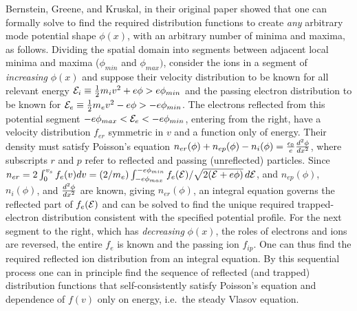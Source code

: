 \documentclass[12pt]{article}
\def\energy{{\cal E}}
\begin{document}
Bernstein, Greene, and Kruskal, in their original
paper\cite{Bernstein1957} showed that one can formally solve to find
the required distribution functions to create \emph{any} arbitrary
mode potential shape $\phi(x)$, with an arbitrary number of minima and
maxima, as follows. Dividing the spatial domain into segments between
adjacent local minima and maxima ($\phi_{min}$ and $\phi_{max})$,
consider the ions in a segment of \emph{increasing} $\phi(x)$ and
suppose their velocity distribution to be known for all relevant
energy $\energy_i\equiv {1\over 2}m_iv^2+e\phi >e\phi_{min}$ and the
passing electron distribution to be known for
$\energy_e\equiv{1\over 2}m_ev^2-e\phi >-e\phi_{min}$. The electrons
reflected from this potential segment
$-e\phi_{max}<\energy_e<-e\phi_{min}$, entering from the right, have a
velocity distribution $f_{er}$ symmetric in $v$ and a function only of
energy. Their density must satisfy Poisson's equation
$n_{er}(\phi)+n_{ep}(\phi)-n_{i}(\phi)={\epsilon_0\over
  e}{d^2\phi\over dx^2}$, where subscripts $r$ and $p$ refer to
reflected and passing (unreflected) particles. Since
$n_{er}=2\int_0^{v_s} f_e(v)dv=
(2/m_e)\int_{-e\phi_{max}}^{-e\phi_{min}}f_e(\energy)/\sqrt{2(\energy+e\phi)}\,
d\energy$, and $n_{ep}(\phi)$, $n_{i}(\phi)$, and
${d^2\phi\over dx^2}$ are known, giving $n_{er}(\phi)$, an integral
equation governs the reflected part of $f_{e}(\energy)$ and can be
solved to find the unique required trapped-electron distribution
consistent with the specified potential profile. For the next segment
to the right, which has \emph{decreasing} $\phi(x)$, the roles of
electrons and ions are reversed, the entire $f_e$ is known and the
passing ion $f_{ip}$. One can thus find the required reflected ion
distribution from an integral equation. By this sequential process one
can in principle find the sequence of reflected (and trapped)
distribution functions that self-consistently satisfy Poisson's
equation and dependence of $f(v)$ only on energy, i.e.\ the steady
Vlasov equation.
\end{document}
